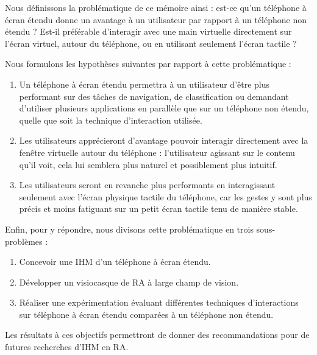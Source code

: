 Nous définissons la problématique de ce mémoire ainsi : est-ce qu'un téléphone à écran étendu donne un avantage à un utilisateur par rapport à un téléphone non étendu ? Est-il préférable d'interagir avec une main virtuelle directement sur l'écran virtuel, autour du téléphone, ou en utilisant seulement l'écran tactile ?

Nous formulons les hypothèses suivantes par rapport à cette problématique :
\begin{enumerate}[label={(H\arabic*)}]
  \item Un téléphone à écran étendu permettra à un utilisateur d'être plus performant sur des tâches de navigation, de classification ou demandant d'utiliser plusieurs applications en parallèle que sur un téléphone non étendu, quelle que soit la technique d'interaction utilisée.
  \item Les utilisateurs apprécieront d'avantage pouvoir interagir directement avec la fenêtre virtuelle autour du téléphone : l'utilisateur agissant sur le contenu qu'il voit, cela lui semblera plus naturel et possiblement plus intuitif.
  \item Les utilisateurs seront en revanche plus performants en interagissant seulement avec l'écran physique tactile du téléphone, car les gestes y sont plus précis et moins fatiguant sur un petit écran tactile tenu de manière stable.
\end{enumerate}
\medskip
 
Enfin, pour y répondre, nous divisons cette problématique en trois sous-problèmes :
\begin{enumerate}
  \item Concevoir une IHM d'un téléphone à écran étendu.
  \item Développer un visiocasque de RA à large champ de vision.
  \item Réaliser une expérimentation évaluant différentes techniques d'interactions sur téléphone à écran étendu comparées à un téléphone non étendu.
\end{enumerate}
\medskip

Les résultats à ces objectifs permettront de donner des recommandations pour de futures recherches d'IHM en RA.